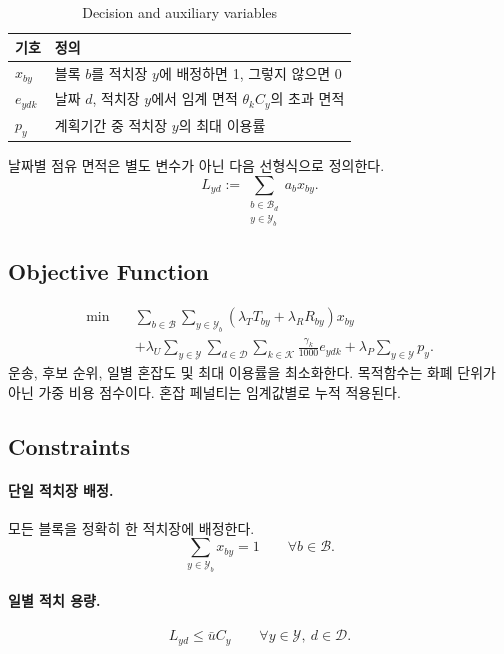 \documentclass[a4paper,11pt]{article}
\begin{document}
\begin{table}[htbp]
\centering
\caption{Decision and auxiliary variables}
\begin{tabularx}{\linewidth}{lX}
\toprule
기호 & 정의 \\
\midrule
$x_{by}$ & 블록 $b$를 적치장 $y$에 배정하면 1, 그렇지 않으면 0 \\
$e_{ydk}$ & 날짜 $d$, 적치장 $y$에서 임계 면적 $\theta_kC_y$의 초과 면적 \\
$p_y$ & 계획기간 중 적치장 $y$의 최대 이용률 \\
\bottomrule
\end{tabularx}
\end{table}
날짜별 점유 면적은 별도 변수가 아닌 다음 선형식으로 정의한다.
\begin{equation}
L_{yd}:=\sum_{\substack{b\in\mathcal B_d\\y\in\mathcal Y_b}}a_bx_{by}.
\end{equation}

\subsection{Objective Function}
\begin{equation}
\begin{aligned}
\min\quad &\sum_{b\in\mathcal B}\sum_{y\in\mathcal Y_b}
(\lambda_TT_{by}+\lambda_RR_{by})x_{by}\\
&+\lambda_U\sum_{y\in\mathcal Y}\sum_{d\in\mathcal D}\sum_{k\in\mathcal K}
\frac{\gamma_k}{1000}e_{ydk}+\lambda_P\sum_{y\in\mathcal Y}p_y.
\end{aligned}
\label{eq:objective}
\end{equation}
운송, 후보 순위, 일별 혼잡도 및 최대 이용률을 최소화한다.
목적함수는 화폐 단위가 아닌 가중 비용 점수이다. 혼잡 페널티는 임계값별로 누적 적용된다.

\subsection{Constraints}
\paragraph{단일 적치장 배정.}
모든 블록을 정확히 한 적치장에 배정한다.
\begin{equation}
\sum_{y\in\mathcal Y_b}x_{by}=1\qquad\forall b\in\mathcal B.
\end{equation}
\paragraph{일별 적치 용량.}
\begin{equation}
L_{yd}\le\bar u C_y\qquad\forall y\in\mathcal Y,\ d\in\mathcal D.
\end{equation}
\end{document}
